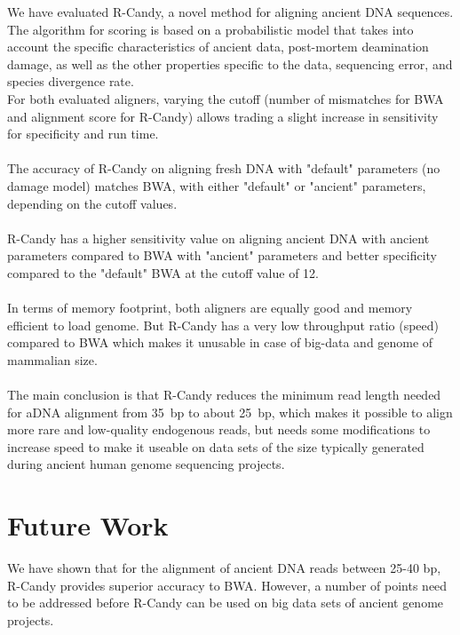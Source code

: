 \documentclass[11pt,a4paper]{report}
\begin{document}
We have evaluated R-Candy, a novel method for aligning ancient DNA sequences.
The algorithm for scoring is based on a probabilistic model that takes into account 
the specific characteristics of ancient data, post-mortem deamination damage, as 
well as the other properties specific to the data, sequencing error, and species
divergence rate. 
\\
For both evaluated aligners, varying the cutoff (number of mismatches for BWA 
and alignment score for R-Candy) allows trading a slight increase in sensitivity 
for specificity and run time.
\\\\
The accuracy of R-Candy on aligning fresh DNA with "default" parameters (no damage model) 
matches BWA, with either "default" or "ancient" parameters, depending  on the cutoff values.
\\\\
R-Candy has a higher sensitivity value on aligning ancient DNA with ancient parameters
compared to BWA with "ancient" parameters and better specificity compared to the 
"default" BWA at the cutoff value of 12.
\\\\
In terms of memory footprint, both aligners are equally good and memory efficient
to load genome. But R-Candy has a very low throughput ratio (speed) compared to 
BWA which makes it unusable in case of big-data and genome of mammalian size. 
\\\\
The main conclusion is that R-Candy reduces the minimum read length needed
for aDNA alignment from 35~bp to about 25~bp, which makes it possible to
align more rare and low-quality endogenous reads, but needs some
modifications to increase speed to make it useable on data sets of the
size typically generated during ancient human genome sequencing
projects. 



 

\section{Future Work} \label{Future Work}
We have shown that for the alignment of ancient DNA reads between 25-40 
bp, R-Candy provides superior accuracy to BWA.  
However, a number of points need to be addressed before R-Candy can be used 
on big data sets of ancient genome projects. 

\end{document}
